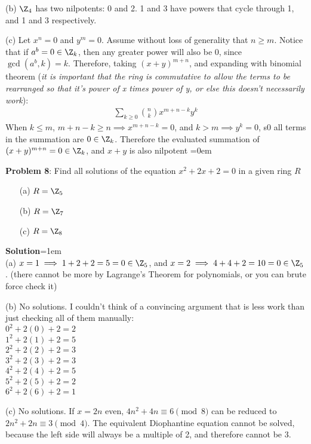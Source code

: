 \documentclass{article}
\begin{document}
(b) $\Z_4$ has two nilpotents: 0 and 2. 1 and 3 have powers that cycle through 1, and 1 and 3 respectively.

(c) Let $x^n = 0$ and $y^m = 0$. Assume without loss of generality that $n \geq m$. Notice that if $a^b = 0 \in \Z_k$, then any greater power will also be 0, since $\gcd(a^b, k) = k$. Therefore, taking $(x + y)^{m+n}$, and expanding with binomial theorem (\emph{it is important that the ring is commutative to allow the terms to be rearranged so that it's power of x times power of y, or else this doesn't necessarily work}):
\begin{align*}
    \sum\limits_{k\geq 0} {n\choose k}x^{m+n-k}y^{k}
\end{align*}
When $k \leq m$, $m + n -k \geq n \implies x^{m + n-k} = 0$, and $k > m \implies y^k = 0$, s0 all terms in the summation are $0 \in \Z_k$. Therefore the evaluated summation of $(x + y)^{m+n} = 0 \in \Z_k$, and $x + y$ is also nilpotent
\newpage\parskip=0em
\begin{mdframed}[backgroundcolor=blue!20]
\textbf{Problem 8}: Find all solutions of the equation $x^2 + 2x + 2 = 0$ in a given ring $R$
\begin{itemize}
    \item[(a)] $R = \Z_5$
    \item[(b)] $R = \Z_7$
    \item[(c)] $R = \Z_8$
\end{itemize}
\end{mdframed}
\textbf{Solution}\parskip=1em\\
(a) $x = 1 \implies 1 + 2 + 2 = 5 = 0 \in \Z_5$, and $x = 2 \implies 4 + 4 + 2 = 10 = 0 \in \Z_5$. (there cannot be more by Lagrange's Theorem for polynomials, or you can brute force check it)

(b) No solutions. I couldn't think of a convincing argument that is less work than just checking all of them manually:\\
$0^2 + 2(0) + 2 = 2$\\
$1^2 + 2(1) + 2 = 5$\\
$2^2 + 2(2) + 2 = 3$\\
$3^2 + 2(3) + 2 = 3$\\
$4^2 + 2(4) + 2 = 5$\\
$5^2 + 2(5) + 2 = 2$\\
$6^2 + 2(6) + 2 = 1$ 

(c) No solutions. If $x = 2n$ even, $4n^2 + 4n \equiv 6 \pmod{8}$ can be reduced to $2n^2 + 2n \equiv 3\pmod{4}$. The equivalent Diophantine equation cannot be solved, because the left side will always be a multiple of 2, and therefore cannot be 3.
\end{document}

